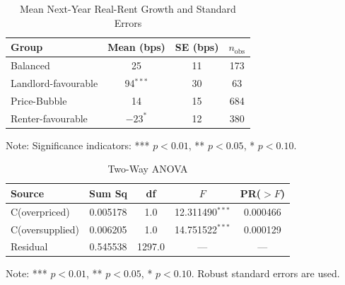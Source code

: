 \documentclass[APA,Times1COL]{WileyNJDv5} %
\begin{document}
	
\begin{table}[t]
	\centering
	\begin{threeparttable}
		\caption{Mean Next-Year Real-Rent Growth and Standard Errors\label{tab:groupmeans}}
		\begin{tabular}{lccc}
			\toprule
			Group                & Mean (bps) & SE (bps) & $n_{\text{obs}}$ \\
			\midrule
			Balanced             & 25         & 11       & 173  \\
			Landlord-favourable  & 94$^{***}$ & 30       & 63   \\
			Price-Bubble         & 14         & 15       & 684  \\
			Renter-favourable    & $-23^{*}$  & 12       & 380  \\
			\bottomrule
		\end{tabular}
		\begin{tablenotes}
			\footnotesize
			\item Note: Significance indicators: *** $p<0.01$, ** $p<0.05$, * $p<0.10$.
		\end{tablenotes}
	\end{threeparttable}
\end{table}

\begin{table}[t]
	\centering
	\begin{threeparttable}
		\caption{Two-Way ANOVA\label{tab:anova}}
		\begin{tabular}{lcccc}
			\toprule
			Source              & Sum Sq   & df    & $F$      & PR($>F$) \\
			\midrule
			C(overpriced)       & 0.005178 & 1.0   & 12.311490$^{***}$  & 0.000466 \\
			C(oversupplied)     & 0.006205 & 1.0   & 14.751522$^{***}$  & 0.000129 \\
			Residual            & 0.545538 & 1297.0& ---      & --- \\
			\bottomrule
		\end{tabular}
		\begin{tablenotes}
			\footnotesize
			\item Note: *** $p<0.01$, ** $p<0.05$, * $p<0.10$. Robust standard errors are used.
		\end{tablenotes}
	\end{threeparttable}
\end{table}
\end{document}

